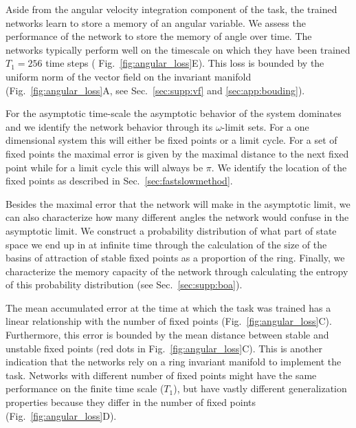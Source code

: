 \documentclass{article} %
\newcounter{ct}
\theoremstyle{definition}
\theoremstyle{remark}
\begin{document}
Aside from the angular velocity integration component of the task, the trained networks learn to store a memory of an angular variable.
We assess the performance of the network to store the memory of angle over time.
The networks typically perform well on the timescale on which they have been trained $T_1=256$ time steps ( Fig.~\ref{fig:angular_loss}E).
%
This loss is bounded by the uniform norm of the vector field  on the invariant manifold (Fig.~\ref{fig:angular_loss}A,  see Sec.~\ref{sec:supp:vf} and \ref{sec:app:bouding}).

For the asymptotic time-scale the asymptotic behavior of the system dominates and we identify the network behavior through its $\omega$-limit sets.
For a one dimensional system this will either be fixed points or a limit cycle.
For a set of fixed points the maximal error is given by the maximal distance to the next fixed point while for a limit cycle this will always be $\pi$.
We identify the location of the fixed points as described in Sec.~\ref{sec:fastslowmethod}.


Besides the maximal error that the network will make in the asymptotic limit, we can also characterize how many different angles the network would confuse in the asymptotic limit.
We construct a probability distribution of what part of state space we end up in at infinite time through the calculation of the size of the basins of attraction of stable fixed points as a proportion of the ring.
Finally, we characterize the memory capacity of the network through calculating the entropy of this probability distribution (see Sec.~\ref{sec:supp:boa}).



The mean accumulated error at the time at which the task was trained has a linear relationship with the number of fixed points (Fig.~\ref{fig:angular_loss}C).
Furthermore, this error is bounded by the mean distance between stable and unstable fixed points (red dots in Fig.~\ref{fig:angular_loss}C).
This is another indication that the networks rely on a ring invariant manifold to implement the task.
Networks with different number of fixed points might have the same performance on the finite time scale ($T_1$), but have vastly different generalization properties because they differ in the number of fixed points (Fig.~\ref{fig:angular_loss}D).
\end{document}
